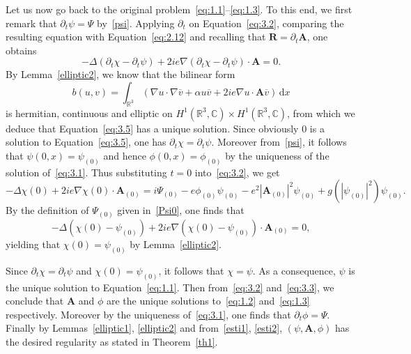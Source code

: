 \documentclass[10pt]{amsart}
\theoremstyle{definition}\newtheorem{defi}[theo]{Definition}\newtheorem{rema}[theo]{Remark}\newtheorem{exam}[theo]{Example}\newtheorem{exem}[theo]{Example}\newtheorem{nota}[theo]{Notation}
\newcommand{\BA}{\mathbf{A}}
\newcommand{\BR}{\mathbf{R}}
\newcommand{\R}{\mathbb{R}}
\newcommand{\Com}{\mathbb{C}}
\newcommand*{\dd}{\mathrm{d}}
\newcommand*{\dx}{\dd x}
\begin{document}
Let us now go back to the original problem~\eqref{eq:1.1}--\eqref{eq:1.3}. To this end, we first remark that $\partial_t \psi=\Psi$ by~\eqref{psi}. Applying $\partial_t$ on Equation~\eqref{eq:3.2}, comparing the resulting equation with Equation~\eqref{eq:2.12} and recalling that $\BR= \partial_t \BA$, one obtains
\begin{equation}\label{eq:3.5}
-\Delta (\partial_t \chi-\partial_t \psi) + 2ie \nabla(\partial_t \chi-\partial_t \psi)\cdot \BA=0.
\end{equation}
By Lemma~\ref{elliptic2}, we know that the bilinear form
\[
{b}(u,v) =\int_{\R^3} (\nabla u\cdot \nabla \overline{v}+\alpha u\overline{v}
+2ie \nabla u\cdot \BA \overline{v}) \,\dx
\]
is hermitian, continuous and elliptic on $H^1(\R^3,\Com) \times H^1(\R^3,\Com)$, from which we deduce that Equation~\eqref{eq:3.5} has a unique solution. Since obviously 0 is a solution to Equation~\eqref{eq:3.5}, one has $\partial_t \chi=\partial_t \psi$. Moreover from~\eqref{psi}, it follows that $\psi(0,x)=\psi_{(0)}$ and hence $\phi(0,x)=\phi_{(0)}$ by the uniqueness of the solution of~\eqref{eq:3.1}. Thus substituting $t=0$ into~\eqref{eq:3.2}, we get
\[
-\Delta \chi(0) +2ie \nabla \chi(0) \cdot \BA_{(0)} =i \Psi_{(0)}-e\phi_{(0)} \psi_{(0)} -e^2 | \BA_{(0)}|^2 \psi_{(0)}
+g(| \psi_{(0)}|^2)\psi_{(0)}.
\]
By the definition of $\Psi_{(0)}$ given in~\eqref{Psi0}, one finds that
\[
-\Delta (\chi(0)-\psi_{(0)})
+2ie \nabla (\chi(0)-\psi_{(0)}) \cdot \BA_{(0)} =0,
\]
yielding that $\chi(0)=\psi_{(0)}$ by Lemma~\ref{elliptic2}.

Since $\partial_t\chi =\partial_t \psi$ and $\chi(0)=\psi_{(0)}$, it follows that $\chi=\psi$. As a consequence, $\psi$ is the unique solution to Equation~\eqref{eq:1.1}. Then from~\eqref{eq:3.2} and~\eqref{eq:3.3}, we conclude that $\BA$ and $\phi$ are the unique solutions to~\eqref{eq:1.2} and~\eqref{eq:1.3} respectively. Moreover by the uniqueness of~\eqref{eq:3.1}, one finds that $\partial_t \phi = \Psi$. Finally by Lemmas~\ref{elliptic1}, \ref{elliptic2} and from~\eqref{esti1}, \eqref{esti2}, $(\psi, \BA, \phi)$ has the desired regularity as stated in Theorem~\ref{th1}.
\end{document}
